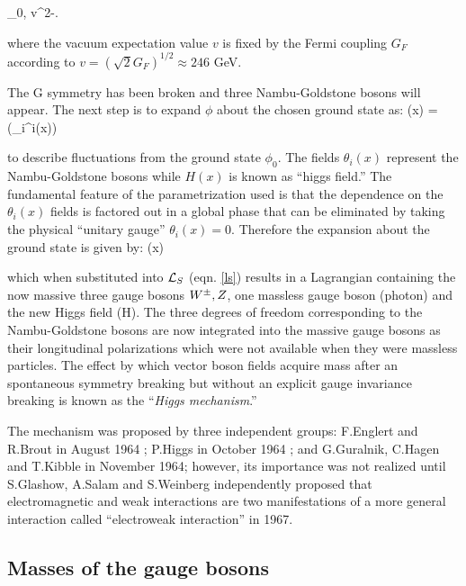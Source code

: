 \beqn\label{field_exp}
\phi_0\equiv{}, \qquad v^2\equiv-.
\eeqn

\noindent where the vacuum expectation value $v$ is fixed by the Fermi coupling $G_F$ according to $v=(\sqrt{2}G_F)^{1/2}\approx 246$ GeV.

\noindent The G symmetry has been broken and three Nambu-Goldstone bosons will appear. The next step is to expand $\phi$ about the chosen ground state as:
\beqn
\phi(x) = \exp\left(\sigma_i\theta^i(x)\right) \approx {} 
\eeqn

\noindent to describe fluctuations from the ground state $\phi_0$. The fields $\theta_i(x)$ represent the Nambu-Goldstone bosons while $H(x)$ is known as ``higgs field.'' The fundamental feature of the parametrization used is that the dependence on the $\theta_i(x)$ fields is factored out in a global phase that can be eliminated by taking the physical ``unitary gauge'' $\theta_i(x)=0$. Therefore the expansion about the ground state is given by:
\beqn\label{higgs_dublet}
\phi(x)
\eeqn

\noindent which when substituted into $\mathcal{L}_S$ (eqn. \ref{ls}) results in a Lagrangian containing the now massive three gauge bosons $W^\pm, Z$, one massless gauge boson (photon) and the new Higgs field (H). The three degrees of freedom corresponding to the Nambu-Goldstone bosons are now integrated into the massive gauge bosons as their longitudinal polarizations which were not available when they were massless particles. The effect by which vector boson fields acquire mass after an spontaneous symmetry breaking but without an explicit gauge invariance breaking is known as the ``\textit{Higgs mechanism}.''

\noindent The mechanism was proposed by three independent groups: F.Englert and R.Brout in August 1964 \cite{englert}; P.Higgs in October 1964 \cite{higgs}; and G.Guralnik, C.Hagen and T.Kibble in November 1964\cite{ghk}; however, its importance was not realized until S.Glashow\cite{glashow}, A.Salam\cite{salam} and S.Weinberg \cite{weinberg} independently proposed that electromagnetic and weak interactions are two manifestations of a more general interaction called ``electroweak interaction'' in 1967.

\subsection{Masses of the gauge bosons}

